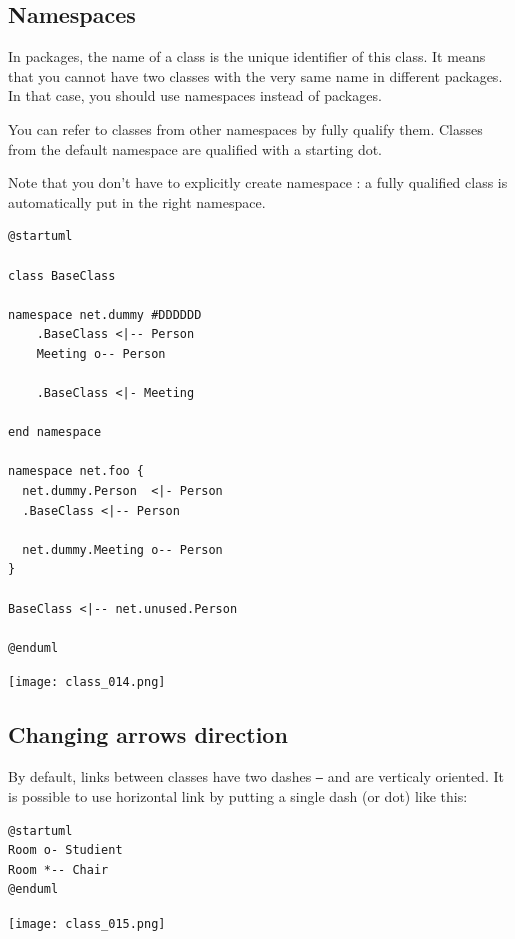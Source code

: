 		
\newpage \subsection{Namespaces}

In packages, the name of a class is the unique identifier of this class.
It means that you cannot have two classes with the very same name in different packages.
In that case, you should use namespaces instead of packages.

You can refer to classes from other namespaces by fully qualify them.
Classes from the default namespace are qualified with a starting dot.

Note that you don't have to explicitly create namespace : a fully qualified class
is automatically put in the right namespace.

\begin{lstlisting}
@startuml

class BaseClass

namespace net.dummy #DDDDDD
    .BaseClass <|-- Person
    Meeting o-- Person
    
    .BaseClass <|- Meeting

end namespace

namespace net.foo {
  net.dummy.Person  <|- Person
  .BaseClass <|-- Person

  net.dummy.Meeting o-- Person
}

BaseClass <|-- net.unused.Person

@enduml
\end{lstlisting}
\begin{center}
\texttt{[image: class\_014.png]}
\end{center}

\newpage \subsection{Changing arrows direction}

By default, links between classes have two dashes \texttt{--} and are verticaly
oriented. It is possible to use horizontal link by putting a single dash (or dot) like this:

\begin{lstlisting}
@startuml
Room o- Studient
Room *-- Chair
@enduml
\end{lstlisting}
\begin{center}
\texttt{[image: class\_015.png]}
\end{center}

